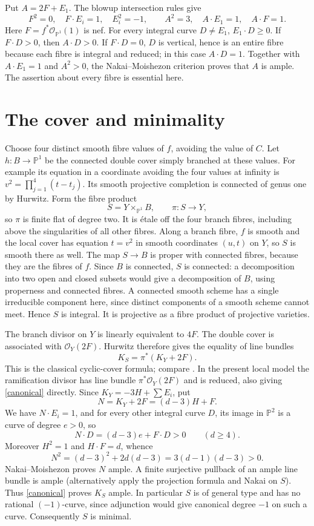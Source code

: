\documentclass[11pt]{article}
\newcommand{\PP}{\mathbb P}
\begin{document}
Put $A=2F+E_1$. The blowup intersection rules give
\[
 F^2=0,\quad F\cdot E_i=1,\quad E_i^2=-1,\qquad
 A^2=3,\quad A\cdot E_1=1,\quad A\cdot F=1.
\]
Here $F=f^*\mathcal O_{\PP^1}(1)$ is nef. For every integral curve
$D\ne E_1$, $E_1\cdot D\ge0$. If $F\cdot D>0$, then $A\cdot D>0$.
If $F\cdot D=0$, $D$ is vertical, hence is an entire fibre because each
fibre is integral and reduced; in this case $A\cdot D=1$. Together with
$A\cdot E_1=1$ and $A^2>0$, the Nakai--Moishezon criterion proves that
$A$ is ample. The assertion about every fibre is essential here.

\section{The cover and minimality}
Choose four distinct smooth fibre values of $f$, avoiding the value of $C$.
Let $h:B\to\PP^1$ be the connected double cover simply branched at these
values. For example its equation in a coordinate avoiding the four values
at infinity is $v^2=\prod_{j=1}^4(t-t_j)$. Its smooth projective completion
is connected of genus one by Hurwitz. Form the fibre product
\[
 S=Y\times_{\PP^1}B,\qquad \pi:S\to Y,
\]
so $\pi$ is finite flat of degree two. It is \'etale off the four branch
fibres, including above the singularities of all other fibres. Along a
branch fibre, $f$ is smooth and the local cover has equation $t=v^2$ in
smooth coordinates $(u,t)$ on $Y$, so $S$ is smooth there as well.
The map $S\to B$ is proper with connected fibres, because they are the
fibres of $f$. Since $B$ is connected, $S$ is connected: a decomposition
into two open and closed subsets would give a decomposition of $B$, using
properness and connected fibres. A connected smooth scheme has a single
irreducible component here, since distinct components of a smooth scheme
cannot meet. Hence $S$ is integral. It is projective as a fibre product of
projective varieties.

The branch divisor on $Y$ is linearly equivalent to $4F$. The double cover
is associated with $\mathcal O_Y(2F)$. Hurwitz therefore gives the equality
of line bundles
\begin{equation}\label{canonical}
 K_S=\pi^*(K_Y+2F).
\end{equation}
This is the classical cyclic-cover formula; compare
\cite[Section~2, p.~3]{Fuentes}. In the present local model the ramification
divisor has line bundle $\pi^*\mathcal O_Y(2F)$ and is reduced, also giving
\eqref{canonical} directly. Since $K_Y=-3H+\sum E_i$, put
\[
 N=K_Y+2F=(d-3)H+F.
\]
We have $N\cdot E_i=1$, and for every other integral curve $D$, its image
in $\PP^2$ is a curve of degree $e>0$, so
\[
 N\cdot D=(d-3)e+F\cdot D>0\qquad(d\ge4).
\]
Moreover $H^2=1$ and $H\cdot F=d$, whence
\[
 N^2=(d-3)^2+2d(d-3)=3(d-1)(d-3)>0.
\]
Nakai--Moishezon proves $N$ ample. A finite surjective pullback of an ample
line bundle is ample (alternatively apply the projection formula and Nakai
on $S$). Thus \eqref{canonical} proves $K_S$ ample. In particular $S$ is of
general type and has no rational $(-1)$-curve, since adjunction would give
canonical degree $-1$ on such a curve. Consequently $S$ is minimal.
\end{document}
